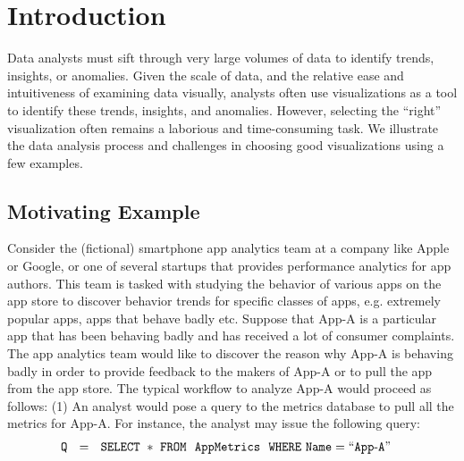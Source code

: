 
\section{Introduction}
\label{sec:introduction}

 
Data analysts must sift through very large volumes of data 
to identify trends, insights, or anomalies. 
Given the scale of data, and the relative ease and 
intuitiveness of examining data visually,
analysts often use visualizations as a tool to identify
these trends, insights, and anomalies.
However, selecting the ``right'' visualization often 
remains a laborious and time-consuming task. 
We illustrate the data analysis
process and challenges in choosing good visualizations using a few examples.




\subsection*{Motivating Example}
Consider the (fictional) smartphone app analytics team at a company like Apple or Google,
or one of several startups that provides performance analytics for app authors.
This team is tasked with studying the behavior of various apps on the
app store to discover behavior trends for specific classes of apps, e.g.
extremely popular apps, apps that behave badly etc.
Suppose that App-A is a particular app that has been behaving badly and has
received a lot of consumer complaints. 
The app analytics team would like to discover the reason why App-A is
behaving badly in order to provide feedback to the makers of App-A or to pull
the app from the app store.
The typical workflow to analyze App-A would proceed as follows:
(1) An analyst would pose a query to the metrics database to pull all the
metrics for App-A.
For instance, the analyst may issue the following query:
\noindent 
\begin{align*}
& \tt Q \ \ = \ \ SELECT \ * \ FROM \ \  AppMetrics \ \ WHERE  \ Name=``App\text{-}A"
\end{align*}

